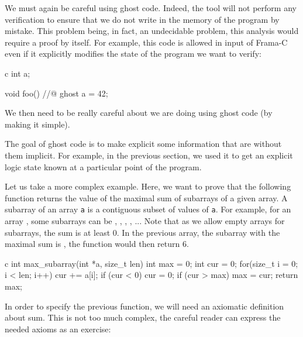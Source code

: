 \documentclass[middle]{zmdocument}
\begin{document}
We must again be careful using ghost code. Indeed, the tool will not
perform any verification to ensure that we do not write in the memory of
the program by mistake. This problem being, in fact, an undecidable
problem, this analysis would require a proof by itself. For example,
this code is allowed in input of Frama-C even if it explicitly modifies
the state of the program we want to verify:



\begin{CodeBlock}{c}
int a;

void foo(){
  //@ ghost a = 42;
}
\end{CodeBlock}



We then need to be really careful about we are doing using ghost code
(by making it simple).





The goal of ghost code is to make explicit some information that are
without them implicit. For example, in the previous section, we used it
to get an explicit logic state known at a particular point of the
program.

Let us take a more complex example. Here, we want to prove that the
following function returns the value of the maximal sum of subarrays of
a given array. A subarray of an array \texttt{a} is a contiguous subset
of values of \texttt{a}. For example, for an array ,
some subarrays can be
\CodeInline{\{\}}, , 
, , ... Note that as we allow
empty arrays for subarrays, the sum is at least 0. In the previous
array, the subarray with the maximal sum is ,
the function would then return 6.



\begin{CodeBlock}{c}
int max_subarray(int *a, size_t len) {
  int max = 0;
  int cur = 0;
  for(size_t i = 0; i < len; i++) {
    cur += a[i];
    if (cur < 0)   cur = 0;
    if (cur > max) max = cur;
  }
  return max;
}
\end{CodeBlock}



In order to specify the previous function, we will need an axiomatic
definition about sum. This is not too much complex, the careful reader
can express the needed axioms as an exercise:
\end{document}
